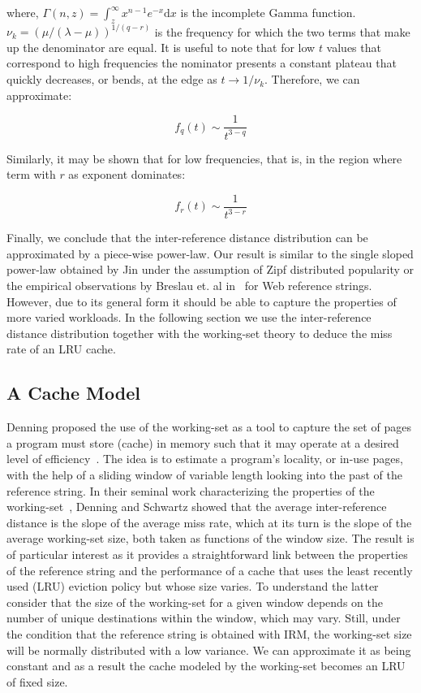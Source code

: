 \documentclass[twocolumn, 10pt]{article}
\theoremstyle{plain}
\begin{document}
\noindent where, $\Gamma(n,z) =\int_z^\infty x^{n-1} e^{-x}\mathrm{d}x$ is the
incomplete Gamma function.  $\nu_k=(\mu/(\lambda-\mu))^{1/(q-r)}$ is the
frequency for which the two terms that make up the denominator are equal. It
is useful to note that for low $t$ values that correspond to high frequencies
the  nominator presents a constant plateau that quickly decreases, or bends,
at the edge as $t\to 1/\nu_{k}$. Therefore, we can approximate:

\begin{equation}
    f_q(t)\sim \dfrac{1}{t^{3-q}}
    \label{eq:fq_asym}
\end{equation}

Similarly, it may be shown that for low frequencies, that is, in the region
where term with $r$ as exponent dominates:


\begin{equation}
    f_r(t)\sim \dfrac{1}{t^{3-r}}
    \label{eq:fr_asym}
\end{equation}

Finally, we conclude that the inter-reference distance distribution can be
approximated by a piece-wise power-law. Our result is similar to the single
sloped power-law obtained by Jin under the assumption of Zipf distributed
popularity or the empirical observations by Breslau et. al
in~\cite{breslau:web_and_zipf} for Web reference strings. However, due to its
general form it should be able to capture the properties of more varied
workloads. 
In the following section we use the inter-reference distance
distribution together with the working-set theory to deduce the miss rate of
an LRU cache. 


\subsection{A Cache Model} 

Denning proposed the use of the working-set as a tool to capture the set of
pages a program must store (cache) in memory such that it may operate at a
desired level of efficiency~\cite{denning:ws_model}. The idea is to estimate a
program's locality, or in-use pages, with the help of a sliding window of
variable length looking into the past of the reference string.  In their
seminal work characterizing the properties of the
working-set~\cite{denning:ws_properties}, Denning and Schwartz showed that the
average inter-reference distance is the slope of the average miss rate,
which at its turn is the slope of the average working-set size, both taken as
functions of the window size. The result is of particular interest as it
provides a straightforward link between the properties of the reference string
and the performance of a cache that uses the least recently used (LRU)
eviction policy but whose size varies. To understand the latter consider that
the size of the working-set for a given window depends on the number of
unique destinations within the window, which may vary. Still, under
the condition 
that the reference string is obtained with IRM, the working-set size will be
normally distributed with a low variance. We can approximate it as being
constant and as a result the cache modeled by the working-set becomes an LRU
of fixed size. 
\end{document}
